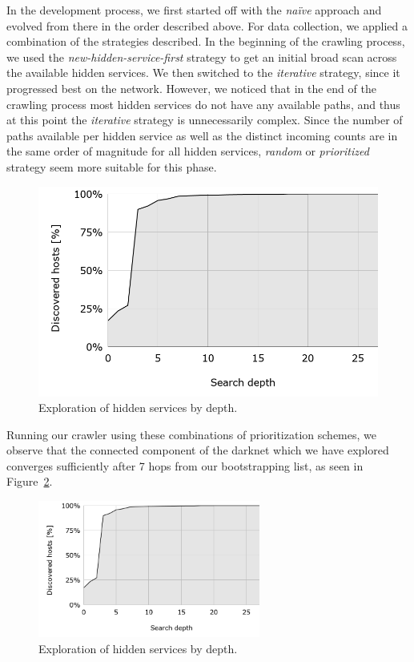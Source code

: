 In the development process, we first started off with the \emph{na\"ive} approach and evolved from there in the order described above. For data collection, we applied a combination of the strategies described. In the beginning of the crawling process, we used the  \emph{new-hidden-service-first} strategy to get an initial broad scan across the available hidden services. We then switched to the \emph{iterative} strategy, since it progressed best on the network. However, we noticed that in the end of the crawling process most hidden services do not have any available paths, and thus at this point the \emph{iterative} strategy is unnecessarily complex. Since the number of paths available per hidden service as well as the distinct incoming counts are in the same order of magnitude for all hidden services,  \emph{random} or  \emph{prioritized} strategy seem more suitable for this phase.

\ifdgruyter
  \begin{figure}[H]
      \centering
      \includegraphics[width=\linewidth]{images/PercentageByDepth.png}
      \caption{Exploration of hidden services by depth.}
      \label{fig:percentageByDepth}
  \end{figure}
\fi
Running our crawler using these combinations of prioritization schemes, we observe that the connected component of the darknet which we have explored converges sufficiently after 7 hops from our bootstrapping list, as seen in Figure~\ref{fig:percentageByDepth}.

\iflncs
  \begin{figure}
      \centering
      \vspace{-55pt}
      \includegraphics[trim={0 1.5cm 0 0}, width=0.65\textwidth]{images/PercentageByDepth.png}
      \caption{Exploration of hidden services by depth.}
      \label{fig:percentageByDepth}
  \end{figure}
\fi
\newpage

